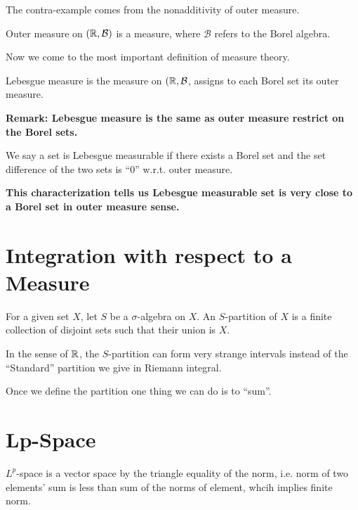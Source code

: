 \documentclass[11pt]{article}
\begin{document}
\begin{proposition}
The contra-example comes from the nonadditivity of outer measure.
\end{proposition}

\begin{proposition}
Outer measure on \((\mathbb{R},\mathcal{B})\) is a measure, where \(\mathcal{B}\) refers to the Borel algebra.
\end{proposition}

Now we come to the most important definition of measure theory.

\begin{definition}
Lebesgue measure is the measure on \((\mathbb{R},\mathcal{B}\), assigns to each Borel set its outer measure.
\end{definition}

\textbf{Remark: Lebesgue measure is the same as outer measure restrict on the Borel sets.}

\begin{definition}
We say a set is Lebesgue measurable if there exists a Borel set and the set difference of the two sets is ``0'' w.r.t. outer measure.
\end{definition}

\textbf{This characterization tells us Lebesgue measurable set is very close to a Borel set in outer measure sense.}
\section{Integration with respect to a Measure}
\label{sec:org625ede7}

\begin{definition}[\(S\)-partition]
For a given set \(X\), let \(S\) be a \(\sigma\)-algebra on \(X\). An \(S\)-partition of \(X\) is a finite collection of disjoint sets such that their union is \(X\).
\end{definition}

In the sense of \(\mathbb{R}\), the \(S\)-partition can form very strange intervals instead of the ``Standard'' partition we give in Riemann integral.

Once we define the partition one thing we can do is to ``sum''.

\begin{definition}

\end{definition}
\section{Lp-Space}
\label{sec:orgc5365a6}

\begin{proposition}
\(L^p\)-space is a vector space by the triangle equality of the norm, i.e. norm of two elements' sum is less than sum of the norms of element, whcih implies finite norm.
\end{proposition}
\end{document}
